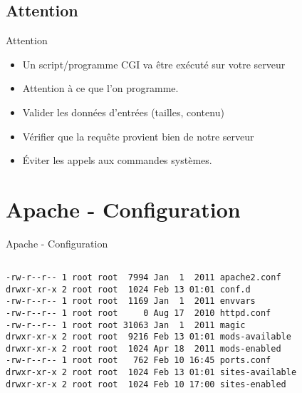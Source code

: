 \begin{frame}{\sectitle}
    \def\subsectitle{Attention}
    \subsection{\subsectitle}
    \begin{block}{\subsectitle}
        \begin{itemize}
            \item Un script/programme CGI va être exécuté sur votre serveur
            \item Attention à ce que l'on programme.
            \item Valider les données d'entrées (tailles, contenu)
            \item Vérifier que la requête provient bien de notre serveur
            \item Éviter les appels aux commandes systèmes.
        \end{itemize}
    \end{block}
\end{frame}

\def\sectitle{Apache - Configuration}
\section{\sectitle}
\begin{frame}[containsverbatim]{\sectitle}
    \def\subsectitle{}
    \subsection{\subsectitle}
    \begin{block}{\subsectitle}
        \begin{verbatim}
-rw-r--r-- 1 root root  7994 Jan  1  2011 apache2.conf
drwxr-xr-x 2 root root  1024 Feb 13 01:01 conf.d
-rw-r--r-- 1 root root  1169 Jan  1  2011 envvars
-rw-r--r-- 1 root root     0 Aug 17  2010 httpd.conf
-rw-r--r-- 1 root root 31063 Jan  1  2011 magic
drwxr-xr-x 2 root root  9216 Feb 13 01:01 mods-available
drwxr-xr-x 2 root root  1024 Apr 18  2011 mods-enabled
-rw-r--r-- 1 root root   762 Feb 10 16:45 ports.conf
drwxr-xr-x 2 root root  1024 Feb 13 01:01 sites-available
drwxr-xr-x 2 root root  1024 Feb 10 17:00 sites-enabled
        \end{verbatim}
    \end{block}
\end{frame}

